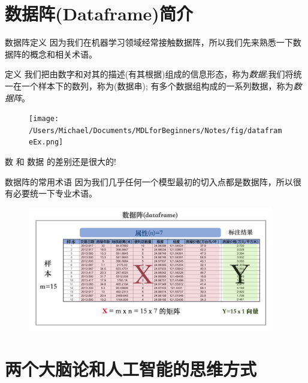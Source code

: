 \documentclass[handout]{beamer}
\begin{document}
\section{数据阵(Dataframe)简介}

\begin{frame}[fragile]{数据阵定义}
	因为我们在机器学习领域经常接触数据阵，所以我们先来熟悉一下数据阵的概念和相关术语。
		
\begin{block}{定义}
	我们把由数字和对其的描述(有其根据)组成的信息形态，称为\textit{数据};我们将统一在一个样本下的数列，称为(数据串); 有多个数据组构成的一系列数据，称为\textit{数据阵}。
\end{block}
\begin{figure}[H]
	\centering
	\texttt{[image: /Users/Michael/Documents/MDLforBeginners/Notes/fig/dataframeEx.png]}
\end{figure}

数 和 数据 的差别还是很大的!
\end{frame}


\begin{frame}{数据阵的常用术语}
	因为我们几乎任何一个模型最初的切入点都是数据阵，所以很有必要统一下专业术语。
	\begin{figure}[H]
		\centering
		\includegraphics[width=0.96\textwidth]{fig/dataframeVis}
	\end{figure}
\end{frame}

\section{两个大脑论和人工智能的思维方式}
\end{document}
